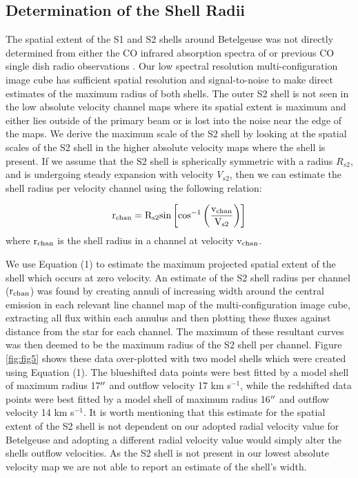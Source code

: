 \documentclass[iop]{emulateapj}
\begin{document}
\subsection{Determination of the Shell Radii} \label{results3} 
The spatial extent of the S1 and S2 shells around Betelgeuse was not directly determined from either the CO infrared absorption spectra of \cite{1979ApJ...233L.135B} or previous CO single dish radio observations \citep{1980ApJ...242L..25K, 1987ApJ...313..400H, 1994ApJ...424L.127H}. Our low spectral resolution multi-configuration image cube has sufficient spatial resolution and signal-to-noise to make direct estimates of the maximum radius of both shells. The outer S2 shell is not seen in the low absolute velocity channel maps where its spatial extent is maximum and either lies outside of the primary beam or is lost into the noise near the edge of the maps. We derive the maximum scale of the S2 shell by looking at the spatial scales of the S2 shell in the higher absolute velocity maps where the shell is present. If we assume that the S2 shell is spherically symmetric with a radius $R_{s2}$, and is undergoing steady expansion with velocity $V_{s2}$, then we can estimate the shell radius per velocity channel using the following relation:

\begin{equation}
\rm{r_{chan}}=R_{s2} \rm{sin}\left[\rm{cos}^{-1}\left(\frac{v_{chan}}{V_{s2}}\right) \right]
\end{equation} 
where $\rm{r_{chan}}$ is the shell radius in a channel at velocity $\rm{v_{chan}}$. 

We use Equation (1) to estimate the maximum projected spatial extent of the shell which occurs at zero velocity. An estimate of the S2 shell radius per channel ($\rm{r_{chan}}$) was found by creating annuli of increasing width around the central emission in each relevant line channel map of the multi-configuration image cube, extracting all flux within each annulus and then plotting these fluxes against distance from the star for each channel. The maximum of these resultant curves was then deemed to be the maximum radius of the S2 shell per channel. Figure \ref{fig:fig5} shows these data over-plotted with two model shells which were created using Equation (1). The blueshifted data points were best fitted by a model shell of maximum radius 17$\mbox{$^{\prime\prime}$}$ and outflow velocity 17 km s${}^{-1}$, while the redshifted data points were best fitted by a model shell of maximum radius 16$\mbox{$^{\prime\prime}$}$ and outflow velocity 14 km s${}^{-1}$. It is worth mentioning that this estimate for the spatial extent of the S2 shell is not dependent on our adopted radial velocity value for Betelgeuse and adopting a different radial velocity value would simply alter the shells outflow velocities. As the S2 shell is not present in our lowest absolute velocity map we are not able to report an estimate of the shell's width.
\end{document}
